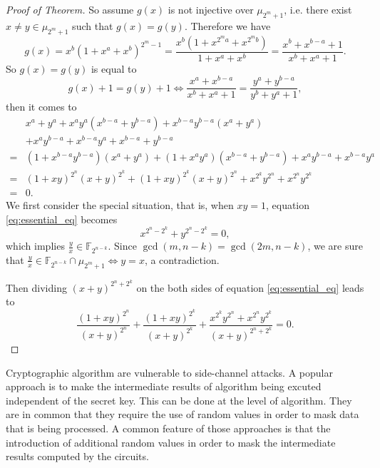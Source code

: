\documentclass[12 pt]{article}
\def\F{{\mathbb F}}
\begin{document}
\begin{proof}[Proof of Theorem]
      So assume $ g(x) $ is not injective over $ \mu_{2^m+1} $, 
      i.e. there exist $ x\ne y\in\mu_{2^m+1} $ such that $ g(x)=g(y) $. 
      Therefore we have 
      \[g(x)=x^b(1+x^a+x^b)^{2^m-1}=\frac{x^b(1+x^{2^ma}+x^{2^mb})}{1+x^a+x^b}=\frac{x^b+x^{b-a}+1}{x^b+x^a+1}.\]
      So $ g(x)=g(y) $ is equal to 
      \[g(x)+1=g(y)+1\Leftrightarrow\frac{x^a+x^{b-a}}{x^b+x^a+1}=\frac{y^a+y^{b-a}}{y^b+y^a+1},\]
      then it comes to
      \begin{equation}\label{eq:essential_eq}
        \begin{aligned}
          &x^a+y^a+x^ay^a(x^{b-a}+y^{b-a})+x^{b-a}y^{b-a}(x^a+y^a)\\
          &+x^ay^{b-a}+x^{b-a}y^a+x^{b-a}+y^{b-a}\\
          =&(1+x^{b-a}y^{b-a})(x^a+y^a)+(1+x^ay^a)(x^{b-a}+y^{b-a})+x^ay^{b-a}+x^{b-a}y^a\\
          =&(1+xy)^{2^n}(x+y)^{2^k}+(1+xy)^{2^k}(x+y)^{2^n}+x^{2^k}y^{2^n}+x^{2^n}y^{2^k}\\
          =&0.
        \end{aligned}
      \end{equation}
      We first consider the special situation, that is, when $ xy=1 $, equation \eqref{eq:essential_eq} becomes 
      \[x^{2^n-2^k}+y^{2^n-2^k}=0,\]
      which implies $ \frac{y}{x}\in\F_{2^{n-k}} $. Since $ \gcd(m,n-k)=\gcd(2m,n-k) $, we are sure that 
      $ \frac{y}{x}\in\F_{2^{n-k}}\cap\mu_{2^m+1}\Leftrightarrow y=x $, a contradiction.

      Then dividing $ (x+y)^{2^n+2^k} $ on the both sides of equation \eqref{eq:essential_eq} leads to 
      \begin{equation}\label{eq:undefined}
        \frac{(1+xy)^{2^n}}{(x+y)^{2^n}}+\frac{(1+xy)^{2^k}}{(x+y)^{2^k}}+\frac{x^{2^k}y^{2^n}+x^{2^n}y^{2^k}}{(x+y)^{2^n+2^k}}=0. 
      \end{equation}

    \end{proof}

    Cryptographic algorithm are vulnerable to side-channel attacks. 
    A popular approach is to make the intermediate results of algorithm being excuted independent of the secret key. 
    This can be done at the level of algorithm. 
    They are in common that they require the use of random values in order to mask data that is being processed. 
    A common feature of those approaches is that the introduction of additional random values in order to mask 
    the intermediate results computed by the circuits.  
\end{document}
